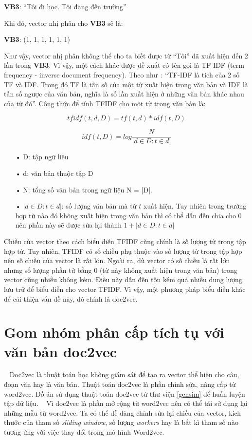 \textbf{VB3}: ``Tôi đi học. Tôi đang đến trường''

Khi đó, vector nhị phân cho \textbf{VB3} sẽ là:

\textbf{VB3}: (1, 1, 1, 1, 1, 1)

Như vậy, vector nhị phân không thể cho ta biết được từ ``Tôi'' đã xuất hiện đến 2 lần trong \textbf{VB3}.
Vì vậy, một cách khác được đề xuất có tên gọi là TF-IDF (term frequency - inverse document frequency).
Theo như~\cite{tf-idf}: ``TF-IDF là tích của 2 số TF và IDF. Trong đó TF là tần số của một từ xuất hiện trong văn bản và IDF là tần số ngược của văn bản, nghĩa là số lần xuất hiện ở những văn bản khác nhau của từ đó''.
Công thức để tính TFIDF cho một từ trong văn bản là:

\begin{equation}
tfidf (t, d, D) = tf(t, d) * idf (t, D)
\end{equation}

\begin{equation}
idf (t, D) = log \frac{N}{|{d \in D: t \in d}|}
\end{equation}

\begin{enumerate}
\item[•]D: tập ngữ liệu
\item[•]d: văn bản thuộc tập D
\item[•]N: tổng số văn bản trong ngữ liệu N = |D|.
\item[•]$|{d \in D: t \in d}|$: số lượng văn bản mà từ $t$ xuất hiện. Tuy nhiên trong trường hợp từ nào đó không xuất hiện trong văn bản thì có thể dẫn đến chia cho 0 nên phần này sẽ được sửa lại thành  $1 + |{d \in D: t \in d}|$
\end{enumerate}

Chiều của vector theo cách biểu diễn TFIDF cũng chính là số lượng từ trong tập hợp từ.
Tuy nhiên, TFIDF có số chiều phụ thuộc vào số lượng từ trong tập hợp nên số chiều của vector là rất lớn.
Ngoài ra, dù vector có số chiều là rất lớn nhưng số lượng phần tử bằng 0 (từ này không xuất hiện trong văn bản) trong vector cũng nhiều không kém.
Điều này dẫn đến tốn kém quá nhiều dung lượng lưu trữ để biểu diễn cho vector TFIDF.
Vì vậy, một phương pháp biểu diễn khác để cải thiện vấn đề này, đó chính là doc2vec.
%
%


\section{Gom nhóm phân cấp tích tụ với văn bản doc2vec}
~\cite{doc2vec-1} Doc2vec là thuật toán học không giám sát để tạo ra vector thể hiện cho câu, đoạn văn hay là văn bản.
Thuật toán doc2vec là phần chỉnh sửa, nâng cấp từ word2vec.
Đồ án sử dụng thuật toán doc2vec từ thư viện \ref{gensim} để huấn luyện tập dữ liệu.
~\cite{doc2vec-2} Vì doc2vec là phần mở rộng từ word2vec nên có thể tái sử dụng lại những mẫu từ word2vec. 
Ta có thể dễ dàng chỉnh sửa lại chiều của vector, kích thước của tham số \textit{sliding window}, số lượng \textit{workers} hay là bất kì tham số nào tương ứng với việc thay đổi trong mô hình Word2vec.

